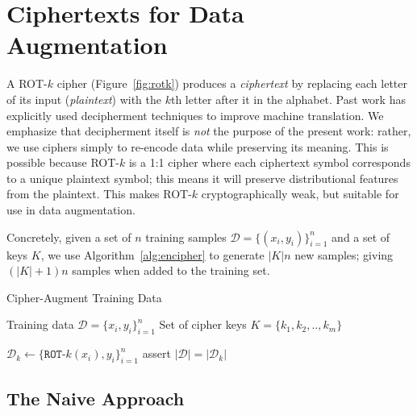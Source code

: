 \documentclass[11pt]{article}
\begin{document}
\section{Ciphertexts for Data Augmentation}
A ROT-$k$ cipher (Figure~\ref{fig:rotk}) produces a \textit{ciphertext} by replacing each letter of its input (\textit{plaintext}) with the $k$th letter after it in the alphabet. 
Past work \cite{dou-knight-2012-large,dou-etal-2014-beyond} has explicitly used decipherment techniques \cite{kambhatla-etal-2018-decipherment} to improve machine translation. We emphasize that decipherment itself is \textit{not} the purpose of the present work:
rather, we use ciphers simply to re-encode
data while preserving its meaning. This is possible because ROT-$k$ is a 1:1 cipher where each ciphertext symbol corresponds to a unique plaintext symbol; this means it will preserve distributional features from the plaintext.
This makes ROT-$k$ cryptographically weak, but suitable for use in data augmentation.


Concretely, given a set of $n$ training samples $\mathcal{D} = \{(x_i, y_i)\}_{i=1}^{n}$ and a set of keys $K$, we use Algorithm~\ref{alg:encipher} to generate 
$|K|n$ new samples; giving $(|K|+1)n$ samples when added to the training set. 
 

\begin{algorithm}
\small
\caption{Cipher-Augment Training Data}\label{alg:encipher}
\begin{algorithmic}
\State Training data $\mathcal{D} = \{x_i,y_i\}_{i=1}^{n}$
\State Set of cipher keys $K = \{k_1, k_2, .. , k_m\}$ 


    \State {}
    \State $\mathcal{D}_{k} \leftarrow \{\texttt{ROT-}\textit{k} (x_i),y_i\}_{i=1}^{n}$ \State {}
    \State assert $|\mathcal{D}| = |\mathcal{D}_{k}|$ \EndFor
\State {}
\EndProcedure

\end{algorithmic}
\end{algorithm}



\subsection{The Naive Approach}
\end{document}
